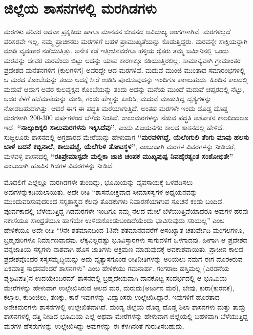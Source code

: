 \section*{ಜಿಲ್ಲೆಯ ಶಾಸನಗಳಲ್ಲಿ ಮರಗಿಡಗಳು}

ಮರಗಳು ಪರಿಸರ ಅಥವಾ ಪ್ರಕೃತಿಯ ಹಾಗೂ ಮಾನವನ ಜೀವನದ ಅವಿಭಾಜ್ಯ ಅಂಗಗಳಾಗಿವೆ. ಮರಗಳಿಲ್ಲದೆ ಪರಿಸರವೇ ಇಲ್ಲ. ನಮ್ಮ ಪ್ರಾಚೀನರು ಮರಗಳಿಗೆ ಬಹಳ ಪ್ರಾಮುಖ್ಯತೆಯನ್ನು ಕೊಡುತ್ತಿದ್ದರು. ಮರವನ್ನೇ ಸಾಕ್ಷಿಯನ್ನಾಗಿ ಮಾಡಿ ವ್ಯವಹಾರ ನಡೆಯುತ್ತಿತ್ತು. ಅನೇಕ ಕಡೆ ಇತ್ತೀಚಿನವರೆಗೂ ಹಳ್ಳಿಯ ರೈತರು ತಮ್ಮ ಜಮೀನಿನಲ್ಲಿ ಒಂದು ಮರವನ್ನು ದೇವರ ಮರವೆಂದು ಬಿಟ್ಟು ಅದನ್ನು ಯಾವ ಕಾರಣಕ್ಕೂ ಕಡಿಯುತ್ತಿರಲಿಲ್ಲ. ಸಾಮಾನ್ಯವಾಗಿ ಗ್ರಾಮಾಂತರ ಪ್ರದೇಶದ ಮನೆತನಗಳಿಗೆ (ಕುಲಗಳಿಗೆ) ಅವರದ್ದೇ ಆದ ಮರಗಳಿವೆ. ಮದುವೆ ಮುಂಜಿ ಮುಂತಾದ ಸಮಾರಂಭಗಳಲ್ಲಿ ಆ ಮರದ ಕೊಂಬೆಯನ್ನು ತಂದು ಅದಕ್ಕೆ ಸೀರೆ ಉಡಿಸಿ ಪೂಜಿಸುವುದನ್ನು ಇಂದಿಗೂ ಕಾಣಬಹುದು. ಹಿಂದಿನ ಕಾಲದಲ್ಲಿ ಮದುವೆ ಆದಾಗ ಅವರ ಕುಲವೃಕ್ಷದ ಕೊಂಬೆಯನ್ನು ತಂದು ಅದನ್ನು ಮನೆಯ ಮುಂದೆ ಮದುವೆ ಚಪ್ಪರದಲ್ಲಿ ನೆಟ್ಟು, ಅದರ ಕೆಳಗೆ ಹಸೆಮಣೆಯನ್ನು ಮಾಡಿ, ಗಂಡು ಹೆಣ್ಣನ್ನು ಕೂರಿಸಿ, ಮದುವೆ ಮಾಡುತ್ತಿದ್ದ ದೃಶ್ಯಗಳನ್ನು ನೋಡಬಹುದಾಗಿತ್ತು. ಆದರೆ ಈಗ ಈ ಪದ್ಧತಿ ಮರೆಯಾಗುತ್ತಿದೆ. ಅಂತಹ ಮರಗಳೇ ಇಂದು ದೊಡ್ಡ ದೊಡ್ಡ ಮರಗಳಾಗಿ 200-300 ವರ್ಷಗಳಿಂದ ಬೆಳೆದು ನಿಂತಿವೆ. ಸಾಲುಮರಗಳನ್ನು ನೆಡುವ ಪದ್ಧತಿ ಅಶೋಕನ ಕಾಲದಿಂದಲೂ ಇದೆ. \textbf{“ನಾಲ್ಕುದಿಕ್ಕಲಿ ಸಾಲುಮರಗಳನು ಇಕ್ಕಿಸಿದೆವು”}, ಎಂದು ವಿಜಯನಗರ ಕಾಲದ ಶಾಸನದಲ್ಲಿ ಹೇಳಿದೆ. ಸುಜ್ಜಲೂರು ಶಾಸನದಲ್ಲಿ ಅಗ್ರಹಾರದ ಮೇರೆಯನ್ನು ಹೇಳುವಾಗ \textbf{“ಮರವಳಿಗದ್ದೆ, ಯೆಲೆಂಗುಲಿ ತೆಂಗು ಮಾವು\general{\break } ಹಲಸು ಬಾಳೆ ಬದನೆ ಕಬ್ಬಿನಾಲೆ, ಕಾಲುಪಚ್ಚೆ, ಯೆಲೆಗುಳಿ ತೋಟಸ್ಥಳ”}, ಎಂಬುದಾಗಿ ಮರಗಳ ವಿವರಗಳನ್ನು ನೀಡಿದರೆ, ಮಳವಳ್ಳಿ ಶಾಸನದಲ್ಲಿ \textbf{“ರತಿಪ್ರೇಮಾಸ್ಪದೇ ಮಲ್ಲಿಕಾ ಜಾಜಿ ಚಂಪಕ ಮುಖ್ಯಪುಷ್ಪ ನಿವಹೈರತ್ಯಂತ ಸಂಶೋಭಿತೇ”} ಎಂಬುದಾಗಿ ಹೂವಿನ ಗಿಡಗಳ ವಿವರಗಳನ್ನು ನೀಡಿದೆ.

ಮೊದಲಿಗೆ ಎಲ್ಲೆಲ್ಲೂ ಮರಗಿಡಗಳೇ ತುಂಬಿದ್ದು, ಭೂಮಿಯನ್ನು ವ್ಯವಸಾಯಕ್ಕೆ ಒಳಪಡಿಸಲು ಅವುಗಳನ್ನು\break ಕಡಿಯಲಾಯಿತು. ಅದೇ ರೀತಿ “ಶಾಸನೋಕ್ತವಾದ ಸೀಮಾಸಸ್ಯಗಳ ಅಧ್ಯಯನವನ್ನು ಮುಂದುವರಿಸುವುದರಿಂದ ಸಸ್ಯಶಾಸ್ತ್ರದ ಕೆಲವು ತೊಡಕುಗಳು ನಿವಾರಣೆಯಾಗುವ ಸೂಚನೆ ಕಂಡು ಬಂದಿದೆ. ಪೂರ್ವಕಾದಲ್ಲಿ ಬೆಳೆಯುತ್ತಿದ್ದ ಗಿಡಮರಗಳೇ ಇಂದಿಗೂ ನಮ್ಮ ನೆಲದ ಮೇಲೆ ಬೆಳೆಯುತ್ತಿವೆಯಾದರೂ ಅವುಗಳ ಹರವು ನಕಾಸೆಯೂ ಸಾಂಧ್ರತೆಯೂ ಹಾಗೆಯೇ ಉಳಿದುಕೊಂಡು\break ಬಂದಿದೆಯೆಂದು ಭಾವಿಸುವುದು ಸರಿಯಲ್ಲ” ಎಂಬ ಹೇಳಿಕೆಯೂ ಅದೇ ರೀತಿ “9ನೇ ಶತಮಾನದಿಂದ 13ನೇ ಶತಮಾನದವರೆಗೆ ಅಸಂಖ್ಯಾತ ಚತುರ್ವೇದಿ ಮಂಗಲಗಳೂ, ಬ್ರಹ್ಮಪುರಿಗಳೂ ನಿರ್ಮಾಣವಾದವು. ಲೆಕ್ಕವಿಲ್ಲದಷ್ಟು ಭೂವಿಸ್ತಾರಗಳು ಸಾಗು\-ವಳಿಗೆ ಒಳಗಾದವು. ಹೀಗಾಗಿ ಆ ಪ್ರದೇಶದ ವನ್ಯಜಾತಿಯ ಸಸ್ಯಗಳು ನಾಶವಾಗಿ ಹೊಸ ಜಾತಿಗಳು ಆಕ್ರಮಣ ಮಾಡುವುದಕ್ಕೆ ಅವಕಾಶವಾಯಿತು. ಪ್ರಾಚೀನ ಕಾಲದ ಪ್ರದೇಶವೊಂದರ ಸಸ್ಯಸಮೃದ್ಧಿಯನ್ನು ಅದು ವ್ಯತ್ಯಾಸಗೊಂಡ ರೀತಿನೀತಿಗಳನ್ನು ಅರಿ\-ಯಲು ನಮಗೆ ಈಗ ದೊರಕಿರುವ ಏಕಮಾತ್ರ ಸಾಧನವೆಂದರೆ ಶಾಸನಗಳು” ಎಂಬ ಹೇಳಿಕೆಯು ಗಮನಾರ್ಹ. ಗಂಗರಾಜ ಹಸ್ತಿಮಲ್ಲ (ಎರಡನೆಯ ಪೃಥಿವಿಪತಿ)ನ ಉದಯೇಂದಿರಮ್ ಶಾಸನದಲ್ಲಿ ಬ್ರಹ್ಮದೇಯವಾಗಿ ದಾನಕೊಟ್ಟ ಸಂದರ್ಭದಲ್ಲಿ ಆ ಭೂಮಿಯ ಮೇರೆಗಳನ್ನು ಹೇಳುವಾಗ ಉಲ್ಲೇಖಿಸಿರುವ ಆಲದ ಮರ, ಮರುದು(ಅರ್ಜುನ ಮರ), ಬೇವು, ಕುರಾ\break (ಕುರವಕ), ಕಲ್ಲಾಲ, ಕುರಿಂಜಿಲು, ತಣಕ್ಕು, ಕಾರೆ ಇವುಗಳನ್ನು ವಿದ್ವಾಂಸರು ಉಲ್ಲೇಖಿಸಿದ್ದಾರೆ. ಇವುಗಳಿಗೆ ಹೊರತಾದ ಅನೇಕ\break ಮರಗಳು ಶಾಸನಗಳಲ್ಲಿ ಉಲ್ಲೇಖಿತವಾಗಿದೆ. ಮಂಡ್ಯ ಜಿಲ್ಲೆಯ ದೊಡ್ಡ ದೊಡ್ಡ ಶಿಲಾ ಶಾಸನಗಳು ಮತ್ತು ತಾಮ್ರ ಶಾಸನಗಳಲ್ಲಿ ದತ್ತಿ ನೀಡಿದ ಭೂಮಿಯ ಎಲ್ಲೆ ಅಥವಾ ಮೇರೆಗಳನ್ನು ಹೇಳುವಾಗ ಜಿಲ್ಲೆಯಲ್ಲಿ ಬಹಳವಾಗಿ ಬೆಳೆಯುತ್ತಿದ್ದ ಮರಗಳ ಹೆಸರುಗಳನ್ನು ಉಲ್ಲೇಖಿಸಿದ್ದು ಅವುಗಳನ್ನು ಈ ಕೆಳಗಿನಂತೆ ಗುರುತಿಸಬಹುದು.


